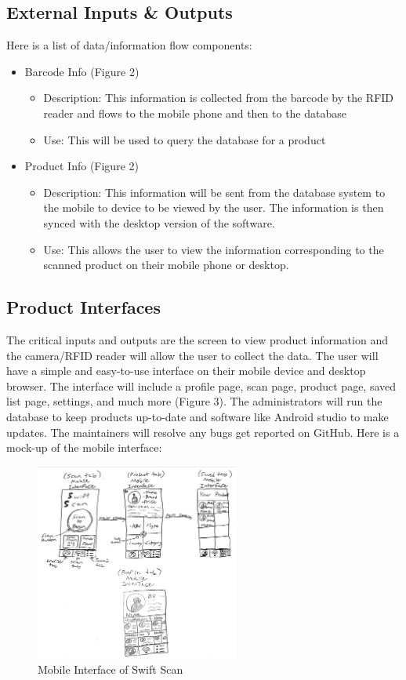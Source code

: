 \subsection{External Inputs \& Outputs}
Here is a list of data/information flow components:
\begin{itemize}
    \item Barcode Info (Figure 2)
    \begin{itemize}
        \item Description: This information is collected from the barcode by the RFID reader and flows to the mobile phone and then to the database
        \item Use: This will be used to query the database for a product
    \end{itemize}
    \item Product Info (Figure 2)
    \begin{itemize}
        \item Description: This information will be sent from the database system to the mobile to device to be viewed by the user. The information is then synced with the desktop version of the software.
        \item Use: This allows the user to view the information corresponding to the scanned product on their mobile phone or desktop.
    \end{itemize}
\end{itemize}

\subsection{Product Interfaces}
The critical inputs and outputs are the screen to view product information and the camera/RFID reader will allow the user to collect the data. The user will have a simple and easy-to-use interface on their mobile device and desktop browser. The interface will include a profile page, scan page, product page, saved list page, settings, and much more (Figure 3). The administrators will run the database to keep products up-to-date and software like Android studio to make updates. The maintainers will resolve any bugs get reported on GitHub. Here is a mock-up of the mobile interface:
\begin{figure}[h!]
	\centering
   	\includegraphics[width=0.60\textwidth]{images/mobile_interface.jpg}
   	\caption{Mobile Interface of Swift Scan}
\end{figure}
